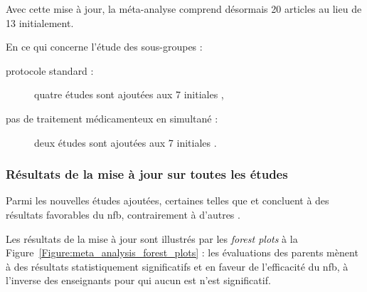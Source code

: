 Avec cette mise à jour, la méta-analyse comprend désormais 20 articles au lieu de 13 initialement.

En ce qui concerne l'étude des sous-groupes :
\begin{description}
\item[protocole standard :] quatre études sont ajoutées \citep{Strehl2017, Baumeister2016, Aggensteiner2019, Minder2018} aux 7 initiales \citep{Bakhshayesh2011,
Christiansen2014, Gevensleben2009, Beauregard2006, Holtmann2009, Heinrich2004, Linden1996},
\item[pas de traitement médicamenteux en simultané :] deux études sont ajoutées \citep{Bazanova2018, Moreno2019} aux 7 initiales \citep{Beauregard2006, 
Gevensleben2009, Bakhshayesh2011, Arnold2014, Linden1996, Christiansen2014, Maurizio2014}.
\end{description}

\subsubsection{Résultats de la mise à jour sur toutes les études}

Parmi les nouvelles études ajoutées, certaines telles que \citet{Shereena2019} et \citet{Strehl2017} concluent à des résultats favorables du \gls{nfb},
contrairement à d'autres \citep{Moreno2019, Minder2018}.

Les résultats de la mise à jour sont illustrés par les \textit{forest plots} à la Figure~\ref{Figure:meta_analysis_forest_plots} : les évaluations
des parents mènent à des résultats statistiquement significatifs et en faveur de l'efficacité du \gls{nfb}, à l'inverse des enseignants pour qui
aucun \gls{est} n'est significatif.

